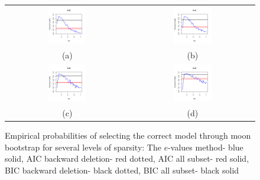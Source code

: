 \begin{figure}
\begin{center}

\begin{tabular}{cc}
		\includegraphics[width=0.32\textwidth]{Chapter-evalue/simplotmoon2}
	& 
		\includegraphics[width=0.32\textwidth]{Chapter-evalue/simplotmoon4} \\
	(a) & (b) \\	
		\includegraphics[width=0.32\textwidth]{Chapter-evalue/simplotmoon6}
	& 
		\includegraphics[width=0.32\textwidth]{Chapter-evalue/simplotmoon8} \\
	(c) & (d) \\	
\end{tabular}

\caption{Empirical probabilities of selecting the correct model through moon bootstrap for several levels of sparsity:  The $e$-values method- blue solid, AIC backward deletion- red dotted, AIC all subset- red solid, BIC backward deletion- black dotted, BIC all subset- black solid}
\label{fig:simplotsmoon}

\end{center}
\end{figure}


